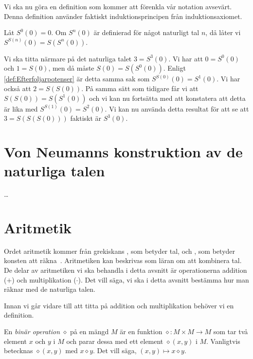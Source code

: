 Vi ska nu göra en definition som kommer att förenkla vår notation avsevärt.
Denna definition använder faktiskt induktionsprincipen från induktionsaxiomet.
\begin{definition}\label{def:Efterfoljarpotenser}
  Låt \(S^0(0) = 0\).
  Om \(S^n(0)\) är definierad för något naturligt tal \(n\), då låter vi
  \(S^{S(n)}(0) = S(S^n(0))\).
\end{definition}
\begin{example}
  Vi ska titta närmare på det naturliga talet \(3=S^3(0)\).
  Vi har att \(0=S^0(0)\) och \(1=S(0)\), men då måste \(S(0)=S(S^0(0))\).
  Enligt \cref{def:Efterfoljarpotenser} är detta samma sak som
  \(S^{S(0)}(0)=S^1(0)\).
  Vi har också att \(2=S(S(0))\).
  På samma sätt som tidigare får vi att \(S(S(0))=S(S^1(0))\) och vi kan nu
  fortsätta med att konstatera att detta är lika med \(S^{S(1)}(0)=S^2(0)\).
  Vi kan nu använda detta resultat för att se att \(3=S(S(S(0)))\) faktiskt
  är \(S^3(0)\).
\end{example}


\section{Von Neumanns konstruktion av de naturliga talen}
\label{sec:vonNeumannNaturliga}
\dots


\section{Aritmetik}
Ordet aritmetik kommer från grekiskans \emph{},
som betyder tal, och \emph{}, som betyder konsten att
räkna~\cite{OED2013arithmetic}.
Aritmetiken kan beskrivas som läran om att kombinera tal.
De delar av aritmetiken vi ska behandla i detta avsnitt är operationerna
addition (\(+\)) och multiplikation (\(\cdot\)).
Det vill säga, vi ska i detta avsnitt bestämma hur man räknar med de naturliga
talen.

Innan vi går vidare till att titta på addition och multiplikation behöver vi en
definition.
\begin{definition}
  En \emph{binär operation} \(\diamond\) på en mängd
  \(M\) är en funktion \(\diamond\colon M\times M\to M\) som tar två
  element \(x\) och \(y\) i \(M\) och parar dessa med ett element
  \(\diamond(x,y)\) i \(M\).
  Vanligtvis betecknas \(\diamond(x,y)\) med \(x\diamond y\).
  Det vill säga, \((x,y)\mapsto x\diamond y\).
\end{definition}


